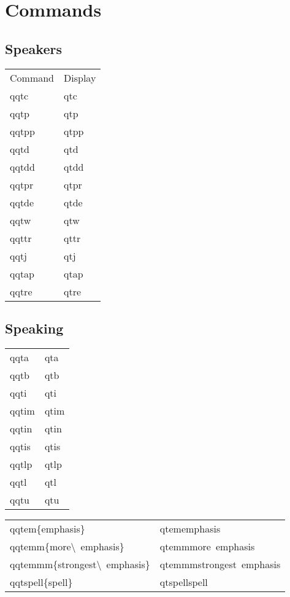 \documentclass{article}
\begin{document}
\newpage
\section{Commands}

\subsection{Speakers}

\begin{tabular}{ll}
Command & Display \\
qqtc & qtc \\
qqtp & qtp \\ 
qqtpp & qtpp \\ 
qqtd & qtd \\ 
qqtdd & qtdd \\ 
qqtpr & qtpr \\ 
qqtde & qtde \\ 
qqtw & qtw \\ 
qqttr & qttr \\ 
qqtj & qtj \\ 
qqtap & qtap \\ 
qqtre & qtre \\ 
\end{tabular}

\newpage
\subsection{Speaking}
\begin{tabular}{ll}
qqta & qta \\ 
qqtb & qtb \\ 
qqti & qti \\ 
qqtim & qtim \\ 
qqtin & qtin \\ 
qqtis & qtis \\ 
qqtlp & qtlp \\
qqtl & qtl \\ 
qqtu & qtu \\
\end{tabular}
\bigskip

\noindent\begin{tabular}{ll}
qqtem\{emphasis\} & qtem{emphasis} \\
qqtemm\{more\textbackslash\ emphasis\} & qtemm{more\ emphasis} \\
qqtemmm\{strongest\textbackslash\ emphasis\} & qtemmm{strongest\ emphasis} \\
qqtspell\{spell\} & qtspell{spell} \\ 
\end{tabular}
\end{document}

